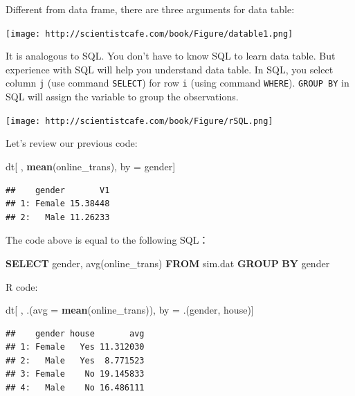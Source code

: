 \documentclass[]{book}
\newenvironment{Shaded}{\begin{snugshade}}{\end{snugshade}}
\newcommand{\KeywordTok}[1]{\textcolor[rgb]{0.13,0.29,0.53}{\textbf{{#1}}}}
\newcommand{\DataTypeTok}[1]{\textcolor[rgb]{0.13,0.29,0.53}{{#1}}}
\newcommand{\StringTok}[1]{\textcolor[rgb]{0.31,0.60,0.02}{{#1}}}
\newcommand{\FunctionTok}[1]{\textcolor[rgb]{0.00,0.00,0.00}{{#1}}}
\newcommand{\NormalTok}[1]{{#1}}
\theoremstyle{definition}
\theoremstyle{definition}
\theoremstyle{remark}
\begin{document}
Different from data frame, there are three arguments for data table:

\texttt{[image: http://scientistcafe.com/book/Figure/datable1.png]}

It is analogous to SQL. You don't have to know SQL to learn data table.
But experience with SQL will help you understand data table. In SQL, you
select column \texttt{j} (use command \texttt{SELECT}) for row
\texttt{i} (using command \texttt{WHERE}). \texttt{GROUP\ BY} in SQL
will assign the variable to group the observations.

\texttt{[image: http://scientistcafe.com/book/Figure/rSQL.png]}

Let's review our previous code:

\begin{Shaded}
\begin{Highlighting}[]
\NormalTok{dt[ , }\KeywordTok{mean}\NormalTok{(online_trans), by =}\StringTok{ }\NormalTok{gender]}
\end{Highlighting}
\end{Shaded}

\begin{verbatim}
##    gender       V1
## 1: Female 15.38448
## 2:   Male 11.26233
\end{verbatim}

The code above is equal to the following SQL：

\begin{Shaded}
\begin{Highlighting}[]
\KeywordTok{SELECT}  \NormalTok{gender, }\FunctionTok{avg}\NormalTok{(online_trans) }\KeywordTok{FROM} \NormalTok{sim.dat }\KeywordTok{GROUP} \KeywordTok{BY} \NormalTok{gender}
\end{Highlighting}
\end{Shaded}

R code:

\begin{Shaded}
\begin{Highlighting}[]
\NormalTok{dt[ , .(}\DataTypeTok{avg =} \KeywordTok{mean}\NormalTok{(online_trans)), by =}\StringTok{ }\NormalTok{.(gender, house)]}
\end{Highlighting}
\end{Shaded}

\begin{verbatim}
##    gender house       avg
## 1: Female   Yes 11.312030
## 2:   Male   Yes  8.771523
## 3: Female    No 19.145833
## 4:   Male    No 16.486111
\end{verbatim}
\end{document}
